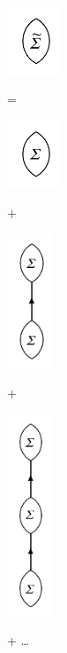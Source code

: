 \begin{minipage}{0.12\textwidth}
	\includegraphics[height=2cm]{./figures/improper.png}
\end{minipage}
\begin{minipage}{0.02\textwidth}
	=
\end{minipage}
\begin{minipage}{0.12\textwidth}
	\includegraphics[height=2cm]{./figures/proper1.png}
\end{minipage}
\begin{minipage}{0.02\textwidth}
	+
\end{minipage}
\begin{minipage}{0.12\textwidth}
	\includegraphics[height=4cm]{./figures/proper2.png}
\end{minipage}
\begin{minipage}{0.02\textwidth}
	+
\end{minipage}
\begin{minipage}{0.12\textwidth}
	\includegraphics[height=6cm]{./figures/proper3.png}
\end{minipage}
\begin{minipage}{0.2\textwidth}
	+ \qquad \dots
\end{minipage}

